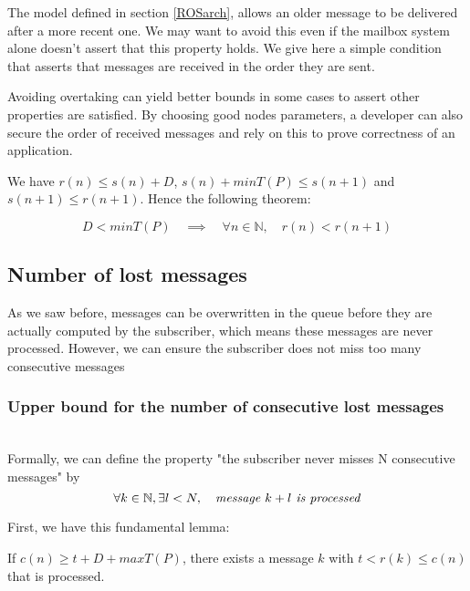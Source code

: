 The model defined in section \ref{ROSarch}, allows an older message to be delivered after a more recent one. We may want to avoid this even if the mailbox system alone doesn't assert that this property holds.
We give here a simple condition that asserts that messages are received in the order they are sent. 

Avoiding overtaking can yield better bounds in some cases to assert other properties are satisfied. By choosing good nodes parameters, a developer can also secure the order of received messages and rely on this to prove correctness of an application.

We have $r(n) \leq s(n) + D$, $s(n) + minT(P) \leq s(n + 1)$ and $s(n + 1) \leq r(n + 1)$. Hence the following theorem:

\begin{thm} 
\[ D < minT(P) \quad \implies \quad \forall n \in \mathbb N, \quad r(n) < r(n + 1)\]
\end{thm}


\subsection{Number of lost messages}

As we saw before, messages can be overwritten in the queue before they are actually computed by the subscriber, which means these messages are never processed. However, we can ensure the subscriber does not miss too many consecutive messages

\subsubsection[Consecutive lost messages]{Upper bound for the number of consecutive lost messages}

\begin{defin}\label{consec}
\\
Formally, we can define the property "the subscriber never misses N consecutive messages" by
\[ \forall k \in \mathbb{N}, \exists l < N, \quad \textrm{\emph{message $k + l$ is processed}}   \]
\end{defin}

First, we have this fundamental lemma:
\begin{lem}\label{existsProcess}
If $c(n) \geq t + D + maxT(P)$, there exists a message $k$ with $t < r(k) \leq c(n)$ that is processed.
\end{lem}

